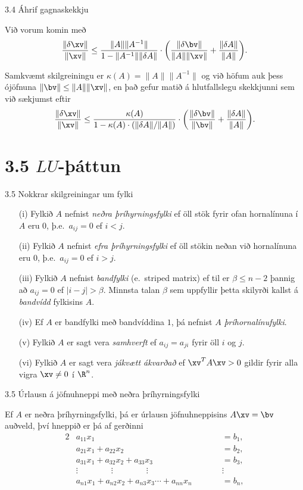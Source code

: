 \begin{frame}{3.4 Áhrif gagnaskekkju} 

Við vorum komin með 
$$
\dfrac{\|\delta\xv\|} {\|\xv\|}\leq 
\dfrac{\|A\|\|A^{-1}\|}{1-\|A^{-1}\|\|\delta A\|}\cdot 
\bigg(\dfrac{\|\delta\bv\|}{\|A\|\|\xv\|}+
\dfrac{\|\delta A\|}{\|A\|}\bigg).
$$

\pause
\smallskip
Samkvæmt skilgreiningu er $\kappa(A)=\|A\|\|A^{-1}\|$ og
við höfum auk þess ójöfnuna $\|\bv\|\leq \|A\|\|\xv\|$, en það gefur 
matið á hlutfallslegu skekkjunni sem við sækjumst eftir
$$
\dfrac{\|\delta\xv\|} {\|\xv\|}\leq 
\dfrac{\kappa(A)}{1-\kappa(A)\cdot(\|\delta A\|/\|A\|)}\cdot 
\bigg(\dfrac{\|\delta\bv\|}{\|\bv\|}+
\dfrac{\|\delta A\|}{\|A\|}\bigg).
$$
\end{frame}

\section*{3.5 $LU$-þáttun}

\begin{frame}{3.5  Nokkrar skilgreiningar um fylki} 
\begin{enumerate}
  \item[(i)] Fylkið $A$ nefnist {\it neðra  þríhyrningsfylki} ef öll stök fyrir
ofan hornalínuna í $A$ eru $0$, þ.e.~$a_{ij}=0$ ef $i<j$.
\pause
  \item[(ii)] Fylkið $A$ nefnist {\it efra þríhyrningsfylki} ef öll
    stökin neðan við hornalínuna eru $0$, þ.e.~$a_{ij}=0$ ef $i>j$. 
\pause
  \item[(iii)] Fylkið $A$ nefnist {\it bandfylki} (e.~striped matrix) ef til er
$\beta \leq n-2$ þannig að $a_{ij}=0$ ef $|i-j|>\beta$. Minnsta talan
$\beta$ sem uppfyllir þetta skilyrði kallst á {\it bandvídd} fylkisins
$A$.\pause
  \item[(iv)] Ef $A$ er bandfylki með bandvíddina $1$, þá nefnist $A$ {\it
  þríhornalínufylki}.\pause
  \item[(v)] Fylkið $A$ er sagt vera {\it samhverft } ef 
$a_{ij}=a_{ji}$ fyrir öll $i$ og $j$.\pause
  \item[(vi)] Fylkið $A$ er sagt vera {\it jákvætt ákvarðað }  
  ef $\xv^TA\xv>0$ gildir fyrir alla vigra $\xv\neq 0$ í $\R^n$.
\end{enumerate}
\end{frame}


\begin{frame}{3.5  Úrlausn á jöfnuhneppi með neðra þríhyrningsfylki} 

Ef $A$ er neðra þríhyrningsfylki, þá er úrlausn
jöfnuhneppisins $A\xv = \bv$ auðveld, því hneppið er þá af gerðinni 
\begin{alignat*}{2}
	&a_{11}x_1&&=b_1,\\
	&a_{21}x_1+a_{22}x_2&&=b_2,\\
	&a_{31}x_1+a_{32}x_2+a_{33}x_3&&=b_3,\\
	&\vdots \qquad \qquad   \vdots \qquad 
	\qquad \vdots& \qquad& \vdots\\
	&a_{n1}x_1+a_{n2}x_2+a_{n3}x_3\cdots+a_{nn}x_n&&=b_n,
\end{alignat*}
\end{frame}


